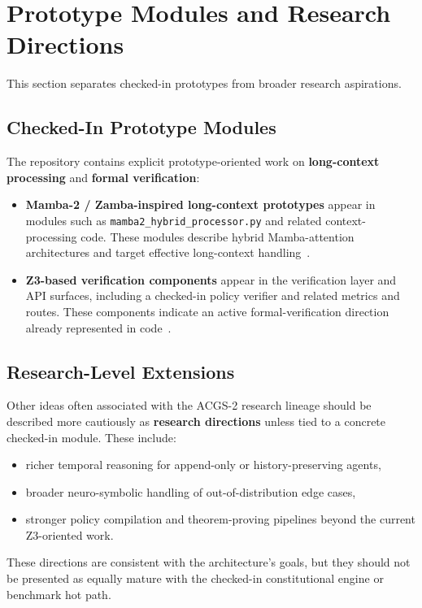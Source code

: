 \documentclass[11pt]{article}
\begin{document}
\section{Prototype Modules and Research Directions}
This section separates checked-in prototypes from broader research aspirations.

\subsection{Checked-In Prototype Modules}
The repository contains explicit prototype-oriented work on \textbf{long-context processing} and \textbf{formal verification}:

\begin{itemize}[leftmargin=1.5em]
  \item \textbf{Mamba-2 / Zamba-inspired long-context prototypes} appear in modules such as \texttt{mamba2\_hybrid\_processor.py} and related context-processing code. These modules describe hybrid Mamba-attention architectures and target effective long-context handling~\cite{mamba2,attention}.
  \item \textbf{Z3-based verification components} appear in the verification layer and API surfaces, including a checked-in policy verifier and related metrics and routes. These components indicate an active formal-verification direction already represented in code~\cite{z3}.
\end{itemize}

\subsection{Research-Level Extensions}
Other ideas often associated with the ACGS-2 research lineage should be described more cautiously as \textbf{research directions} unless tied to a concrete checked-in module. These include:

\begin{itemize}[leftmargin=1.5em]
  \item richer temporal reasoning for append-only or history-preserving agents,
  \item broader neuro-symbolic handling of out-of-distribution edge cases,
  \item stronger policy compilation and theorem-proving pipelines beyond the current Z3-oriented work.
\end{itemize}

These directions are consistent with the architecture's goals, but they should not be presented as equally mature with the checked-in constitutional engine or benchmark hot path.
\end{document}
